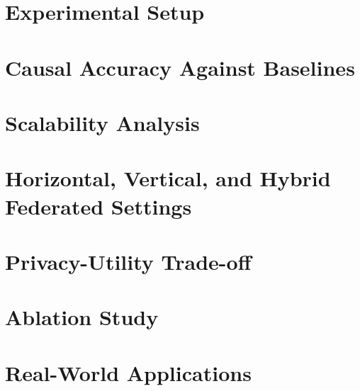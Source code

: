 \section{Experimental Setup}
\lipsum[2]

\section{Causal Accuracy Against Baselines}
\lipsum[2]

\section{Scalability Analysis}
\lipsum[2]

\section{Horizontal, Vertical, and Hybrid Federated Settings}
\lipsum[2]

\section{Privacy-Utility Trade-off}
\lipsum[2]

\section{Ablation Study}
\lipsum[2]

\section{Real-World Applications}
\lipsum[2]
